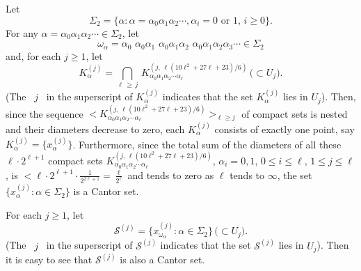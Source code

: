 \documentclass[12pt]{article}
\newcommand{\al}{\alpha}
\begin{document}
Let
$$
\Sigma_2 = \{ \al : \al = \al_0\al_1\al_2 \cdots, \al_i = 0 \,\, \text{or} \,\, 1, \, i \ge 0 \}.
$$
\indent For any $\al = \al_0\al_1\al_2 \cdots \in \Sigma_2$, let 
{\large 
$$
\omega_\al = \al_0 \,\, \al_0\al_1 \,\, \al_0\al_1\al_2 \,\, \al_0\al_1\al_2\al_3 \cdots \in \Sigma_2
$$} 
and, for each $j \ge 1$, let 
$$
K_\al^{(j)} = \bigcap_{\ell \, \ge \, j} \, K_{\al_0\al_1\al_2\cdots \al_\ell}^{(j, \, \ell(10\ell^2+27\ell+23)/6)} \, \big(\subset U_j\big).
$$ 
\big(The \, $j$ \, in the superscript of $K_\al^{(j)}$ indicates that the set $K_\al^{(j)}$ lies in $U_j$\big).  Then, since the sequence $< K_{\al_0\al_1\al_2\cdots \al_\ell}^{(j, \, \ell(10\ell^2+27\ell+23)/6)}>_{\ell \ge j}$ of compact sets is nested and their diameters decrease to zero, each $K_\alpha^{(j)}$ consists of exactly one point, say $K_\al^{(j)} = \{ x_\al^{(j)} \}$.  Furthermore, since the total sum of the diameters of all these $\ell \cdot 2^{\ell+1}$ compact sets $K_{\al_0\al_1\al_2\cdots \al_\ell}^{(j, \,\ell(10\ell^2+27\ell+23)/6)}$, $\al_i = 0, 1$, $0 \le i \le \ell$, $1 \le j \le \ell$, is $< \ell \cdot 2^{\ell+1} \cdot \frac 1{2^{2\ell+1}} = \frac \ell{2^{\ell}}$ and tends to zero as $\ell$ tends to $\infty$, the set $\{ x_\alpha^{(j)} : \alpha \in \Sigma_2 \}$ is a Cantor set.

For each $j \ge 1$, let 
$$
\mathcal S^{(j)} = \{ x_{\omega_\al}^{(j)} : \al \in \Sigma_2 \} \, \big(\subset U_j\big).
$$
\big(The \, $j$ \, in the superscript of $\mathcal S^{(j)}$ indicates that the set $\mathcal S^{(j)}$ lies in $U_j$\big).  Then it is easy to see that $\mathcal S^{(j)}$ is also a Cantor set.  
\end{document}
